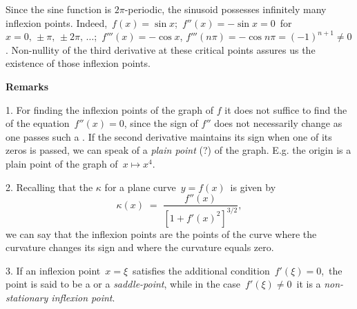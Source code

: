 \documentclass[12pt]{article}
\theoremstyle{definition}
\begin{document}
Since the sine function is $2\pi$-periodic, the sinusoid possesses infinitely many inflexion points.  Indeed,\, 
$f(x) = \sin x$;\, $f''(x) = -\sin x = 0$\, for\, $x = 0,\,\pm\pi,\,\pm2\pi,\,\dots$;\, $f'''(x) = -\cos x$, $f'''(n\pi) = -\cos n\pi = (-1)^{n+1} \neq 0$.  Non-nullity of the third derivative at these critical points assures us the existence of those inflexion points.

\textbf{Remarks}

1.  For finding the inflexion points of the graph of $f$ it does not suffice to find the  of the equation\, $f''(x) = 0$, since the sign of $f''$ does not necessarily change as one passes such a .  If the second derivative maintains its sign when one of its zeros is passed, we can speak of a {\em plain point} (?) of the graph.  E.g. the origin is a plain point of the graph of\, $x\mapsto x^4$.

2.  Recalling that the  $\kappa$ for a plane curve \,$y = f(x)$\, is given by
$$\kappa(x) \;=\; \frac{f''(x)}{[1+f'(x)^2]^{3/2}},$$
we can say that the inflexion points are the points of the curve where the curvature changes its sign and where the curvature equals zero.

3.  If an inflexion point\, $x = \xi$\, satisfies the additional condition \,$f'(\xi) = 0$,\, the point is said to be a  or a {\em saddle-point}, while in the case\, $f'(\xi) \neq 0$\, it is a {\em non-stationary inflexion point}.
\end{document}
